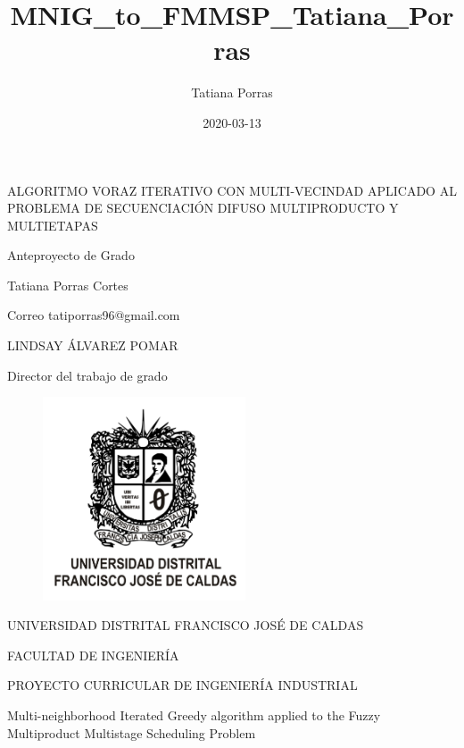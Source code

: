 \documentclass{article}
\title{MNIG_to_FMMSP_Tatiana_Porras}
\date{2020-03-13}
\author{Tatiana Porras}
\begin{document}
\begin{titlepage}
    \begin{center}
    ALGORITMO VORAZ ITERATIVO CON MULTI-VECINDAD APLICADO AL PROBLEMA DE SECUENCIACIÓN DIFUSO MULTIPRODUCTO Y MULTIETAPAS
    \par \bigskip
    Anteproyecto de Grado
    \par \vspace{5cm}
    Tatiana Porras Cortes
    \par \medskip
    Correo \hspace{1cm} tatiporras96@gmail.com
    \par \bigskip
    LINDSAY ÁLVAREZ POMAR \par Director del trabajo de grado
    \par \vspace{1cm}
    \begin{figure}[h!]
        \begin{center}
        \includegraphics[width=6cm]{EscudoUD1.png}
        \end{center}
    \end{figure}
    \par UNIVERSIDAD DISTRITAL FRANCISCO JOSÉ DE CALDAS
    \par FACULTAD DE INGENIERÍA
    \par PROYECTO CURRICULAR DE INGENIERÍA INDUSTRIAL
    \end{center}
\end{titlepage}



Multi-neighborhood Iterated Greedy algorithm applied to the Fuzzy Multiproduct Multistage Scheduling Problem
\end{document}

